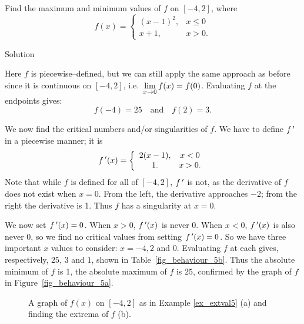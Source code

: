 \begin{example}\label{ex_extval5}
Find the maximum and minimum values of $f$ on $[-4,2]$, where $$f(x) = \left\{\begin{array}{cc} (x-1)^2, & x\leq 0 \\ x+1, & x>0. \end{array}\right. $$

Solution 

Here $f$ is piecewise--defined, but we can still apply the same approach as before  since it is continuous on $[-4,2]$, i.e.\ $\displaystyle\lim_{x\to0}f(x) =f(0)$. Evaluating $f$ at the endpoints gives: 
$$ f(-4) = 25 \quad \text{and} \quad f(2) = 3.$$

We now find the critical numbers and/or singularities of $f$. We have to define $f\,'$ in a piecewise manner; it is 
$$f\,'(x) =\left\{\begin{array}{cc} 2(x-1), & x < 0 \\ 1. & x>0. \end{array}\right. $$
 Note that while $f$ is defined for all of $[-4,2]$, $f\,'$ is not, as the derivative of $f$ does not exist when $x=0$. From the left, the derivative approaches $-2$; from the right the derivative is 1. Thus $f$ has a singularity  at $x=0$.

We now set $f\,'(x) = 0$. When $x >0$, $f\,'(x)$ is never 0.  When $x<0$, $f\,'(x)$ is also never 0, so we find no critical values from setting $f\,'(x)=0$. So we have three important $x$ values to consider: $x= -4, 2$ and $0$. Evaluating $f$ at each gives, respectively, $25$, $3$ and $1$, shown in Table~\ref{fig_behaviour_5b}. Thus the absolute minimum of $f$ is 1, the absolute maximum of $f$ is $25$, confirmed by the graph of $f$ in Figure~\ref{fig_behaviour_5a}.

\begin{figure}[H]
  \centering
  \qquad
\caption{A graph of $f(x)$ on $[-4,2]$ as in Example \ref{ex_extval5} (a) and finding the extrema of $f$ (b).}
\end{figure}

\end{example}


